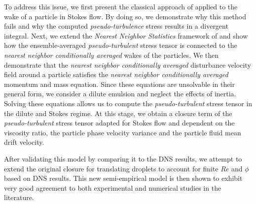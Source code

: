 To address this issue, we first present the classical approach of \citet{van1998pseudo} applied to the wake of a particle in Stokes flow. 
By doing so, we demonstrate why this method fails and why the computed \textit{pseudo-turbulence} stress results in a divergent integral. 
Next, we extend the \textit{Nearest Neighbor Statistics} framework of \citet{zhang2021ensemble} and show how the ensemble-averaged \textit{pseudo-turbulent} stress tensor is connected to the \textit{nearest neighbor conditionally averaged} wakes of the particles. 
We then demonstrate that the \textit{nearest neighbor conditionally averaged} disturbance velocity field around a particle satisfies the \textit{nearest neighbor conditionally averaged} momentum and mass equation. 
Since these equations are unsolvable in their general form, we consider a dilute emulsion and neglect the effects of inertia.
Solving these equations allows us to compute the \textit{pseudo-turbulent} stress tensor in the dilute and Stokes regime. 
At this stage, we obtain a closure term of the \textit{pseudo-turbulent} stress tensor adapted for Stokes flow and dependent on the viscosity ratio, the particle phase velocity variance and the particle fluid mean drift velocity.  


After validating this model by comparing it to the DNS results, we attempt to extend the original closure for translating droplets to account for finite $Re$ and $\phi$ based on DNS results.
This new semi-empirical model is then shown to exhibit very good agreement to both experimental and numerical studies in the literature. 

